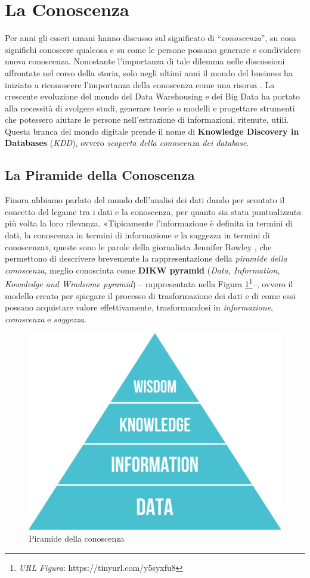 \section{La Conoscenza}

Per anni gli esseri umani hanno discusso sul significato di “\textit{conoscenza}”, su cosa significhi conoscere qualcosa e su come le persone possano generare e condividere nuova conoscenza. Nonostante l'importanza di tale dilemma nelle discussioni affrontate nel corso della storia, solo negli ultimi anni il mondo del business ha iniziato a riconoscere l'importanza della conoscenza come una risorsa \cite{knowledge_management_tools}.
La crescente evoluzione del mondo del Data Warehousing e dei Big Data ha portato alla necessità di svolgere studi, generare teorie o modelli e progettare strumenti che potessero aiutare le persone nell'estrazione di informazioni, ritenute, utili. Questa branca del mondo digitale prende il nome di \textbf{Knowledge Discovery in Databases} (\textit{KDD}), ovvero \textit{scoperta della conoscenza dei database}.

\subsection{La Piramide della Conoscenza}
Finora abbiamo parlato del mondo dell'analisi dei dati dando per scontato il concetto del legame tra i dati e la conoscenza, per quanto sia stata puntualizzata più volta la loro rilevanza. «Tipicamente l'informazione è definita in termini di dati, la conoscenza in termini di informazione e la saggezza in termini di conoscenza», queste sono le parole della giornalista Jennifer Rowley \cite{rowley_dikw_hierarchy}, che permettono di descrivere brevemente la rappresentazione della \textit{piramide della conoscenza}, meglio conosciuta come \textbf{DIKW pyramid} (\textit{Data, Information, Kownledge and Windsome pyramid}) -- rappresentata nella Figura \ref{fig:DIKW Pyramid}\footnote{\textit{URL Figura}: https://tinyurl.com/y5syxfu8}--, ovvero il modello creato per spiegare il processo di trasformazione dei dati e di come essi possano acquistare valore effettivamente, trasformandosi in \textit{informazione}, \textit{conoscenza} e \textit{saggezza}.

\begin{figure}[H]
    \centering
    \includegraphics[width=0.6\linewidth]{figure//capitolo_3/DIKW Pyramid.pdf}
    \caption{Piramide della conoscenza}
    \label{fig:DIKW Pyramid}
\end{figure}

